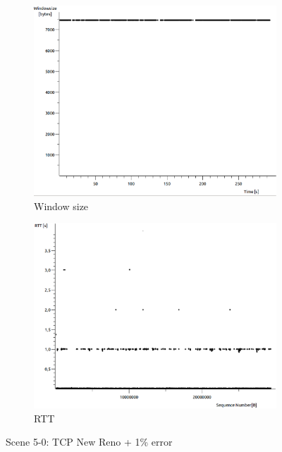 \documentclass[conference,a4paper]{IEEEtran}
\begin{document}
\begin{figure}
\begin{subfigure}[b]{0.2\textwidth}
  \includegraphics[width=\textwidth]{s5-0_wsize}
  \caption{Window size}
 \end{subfigure}
 \begin{subfigure}[b]{0.2\textwidth}
  \includegraphics[width=\textwidth]{s5-0_rtt}
  \caption{RTT}
 \end{subfigure}
 \caption{Scene 5-0: TCP New Reno + 1\% error}
\end{figure}
\end{document}
